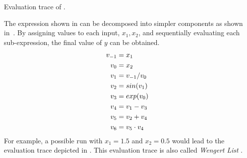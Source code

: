\begin{margintable}[*-12] %
    \caption[Evaluation Trace]{Evaluation trace of .}
    \centering
\end{margintable}
The expression shown in  can be decomposed into simpler components as
shown in~. By assigning values to each input, $x_1, x_2$, and
sequentially evaluating each sub-expression, the final value of $y$ can be
obtained.
\begin{equation}
    \labeq{2_6}
    \begin{split}
        v_{-1} &= x_1\\
        v_0 &= x_2\\
        v_1 &= v_{-1} / v_0\\
        v_2 &= sin(v_1)\\
        v_3 &= exp(v_0)\\
        v_4 &= v_1 - v_3\\
        v_5 &= v_2 + v_4\\
        v_6 &= v_5 \cdot v_4\\
    \end{split}
\end{equation}
For example, a possible run with $x_1=1.5$ and $x_2=0.5$ would lead to the
evaluation trace depicted in . This evaluation trace is also
called \emph{Wengert List} .
